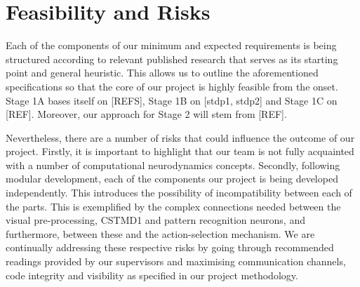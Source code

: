 \documentclass[a4paper,11pt]{article}
\begin{document}
\section{Feasibility and Risks}

Each of the components of our minimum and expected requirements is being structured according to relevant published research that serves as its starting point and general heuristic. This allows us to outline the aforementioned specifications so that the core of our project is highly feasible from the onset. Stage 1A bases itself on [REFS], Stage 1B on [stdp1, stdp2] and Stage 1C on [REF]. Moreover, our approach for Stage 2 will stem from [REF].

Nevertheless, there are a number of risks that could influence the outcome of our project. Firstly, it is important 
to highlight that our team is not fully acquainted with a number of computational neurodynamics concepts. Secondly, following modular development, each of the components our project is being developed independently. This introduces the possibility of incompatibility between each of the parts. This is exemplified by the complex connections needed between the visual pre-processing, CSTMD1 and pattern recognition neurons, and furthermore, between these and the action-selection mechanism. We are continually addressing these respective risks by going through recommended readings provided by our supervisors and maximising communication channels, code integrity and visibility as specified in our project methodology.
\end{document}
